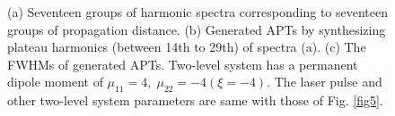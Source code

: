 \documentclass[10pt,letterpaper]{article}
\begin{document}
\begin{figure}[!htbp]
\centering
	\hspace{-0.3in}
\caption{(a) Seventeen groups of harmonic spectra corresponding to seventeen groups of propagation distance. (b) Generated APTs by synthesizing plateau harmonics (between 14th to 29th) of spectra (a). (c) The FWHMs of generated APTs. Two-level system has a permanent dipole moment of $\mu_{11}=4,\;\mu_{22}=-4(\xi=-4)$. The laser pulse and other two-level system parameters are same with those of Fig. \ref{fig5}.}
\label{fig6}
\end{figure}
\end{document}

